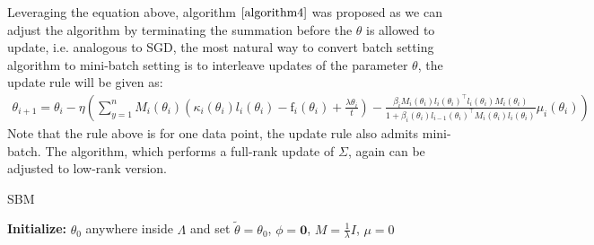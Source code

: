 \documentclass{article}
\begin{document}
 Leveraging the equation above, algorithm $\ref{algorithm4}$ was proposed as we can adjust the algorithm by terminating the summation before the $\theta$ is allowed to update, i.e. analogous to SGD,
 the most natural way to convert batch setting algorithm to mini-batch setting is to interleave updates of the parameter $\theta$, the update rule will be given as:
 \begin{equation}
  \begin{aligned}
    \theta_{i+1} = \theta_i - \eta( \sum_{y =1}^{n} M_{i}(\theta_i)(\kappa_i(\theta_i) l_i(\theta_i) - \text{f}_i(\theta_i) + \frac{\lambda \theta_i}{t}) - \frac{\beta_i M_i(\theta_i) l_i(\theta_i)^{\top} l_{i}(\theta_i) M_{i}(\theta_i)}{1 + \beta_{i}(\theta_i) l_{i-1}(\theta_i)^{\top} M_{i}(\theta_i) l_{i}(\theta_i)} \mu_{i}(\theta_i) )  \nonumber
  \end{aligned}
  \label{updaterule}
 \end{equation} 
 Note that the rule above is for one data point, the update rule also admits mini-batch. The algorithm, which performs a full-rank update of $\Sigma$, again can be adjusted to low-rank version.
  
 \begin{algorithm}[H]
    \caption{SBM}
    \textbf{Initialize:} $\theta_0$ anywhere inside $\Lambda$ and set $\tilde{\theta} = \theta_0$,  $\phi = \textbf{0}$,  $M = \frac{1}{\lambda} I$,  $\mu = 0$\;    
    \KwOut{$\hat{\theta} = \tilde{\theta}$}
    \label{algorithm4}
    \end{algorithm}
\end{document}
